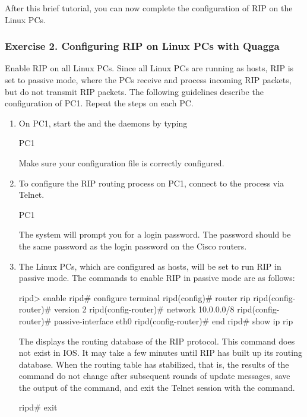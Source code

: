 After this brief tutorial, you can now complete the configuration of RIP on the Linux PCs.

\subsubsection*{Exercise 2. Configuring RIP on Linux PCs with Quagga}

Enable RIP on all Linux PCs. Since all Linux PCs are running as hosts, RIP is set to passive mode, where the PCs receive and process incoming RIP packets, but do not transmit RIP packets. The following guidelines describe the configuration of PC1. Repeat the steps on each PC.

\begin{enumerate}
	\item On PC1, start the  and the daemons by typing 
		\begin{cmdblock}
	PC1%
		\end{cmdblock}
		Make sure your  configuration file is correctly configured.
	\item To configure the RIP routing process on PC1, connect to the  process via Telnet.
		\begin{cmdblock}
	PC1%
		\end{cmdblock}
		The system will prompt you for a login password. The password should be the same password as the login password on the Cisco routers.
	\item The Linux PCs, which are configured as hosts, will be set to run RIP in passive mode. The commands to enable RIP in passive mode are as follows:
		\begin{cmdblock}
	ripd> enable
	ripd# configure terminal
	ripd(config)# router rip 
	ripd(config-router)# version 2 
	ripd(config-router)# network 10.0.0.0/8 
	ripd(config-router)# passive-interface eth0 
	ripd(config-router)# end
	ripd# show ip rip
		\end{cmdblock}
		The  displays the routing database of the RIP protocol. This command does not exist in IOS. It may take a few minutes until RIP has built up its routing database. When the routing table has stabilized, that is, the results of the command  do not change after subsequent rounds of update messages, save the output of the command, and exit the Telnet session with the command.
		\begin{cmdblock}
	ripd# exit
		\end{cmdblock}

\end{enumerate}

